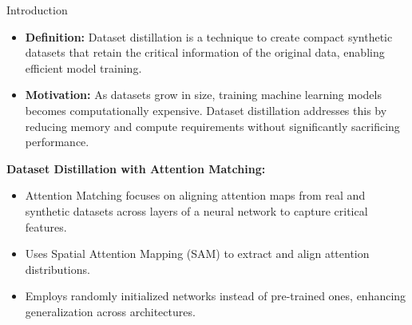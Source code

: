 \documentclass[final]{beamer}
\newlength{\colwidth}
\begin{document}
\begin{columns}
\begin{column}{\colwidth}
\begin{block}{Introduction}
		\begin{itemize}
			\item \textbf{Definition:} Dataset distillation is a technique to create compact synthetic datasets that retain the critical information of the original data, enabling efficient model training.
			\item \textbf{Motivation:} As datasets grow in size, training machine learning models becomes computationally expensive. Dataset distillation addresses this by reducing memory and compute requirements without significantly sacrificing performance.
		\end{itemize}
		\textbf{Dataset Distillation with Attention Matching:}
		\begin{itemize}
			\item  Attention Matching focuses on aligning attention maps from real and synthetic datasets across layers of a neural network to capture critical features.
			\item Uses Spatial Attention Mapping (SAM) to extract and align attention distributions.
			\item Employs randomly initialized networks instead of pre-trained ones, enhancing generalization across architectures.
		\end{itemize}
		\end{block}
		

\end{column}
\end{columns}
\end{document}
